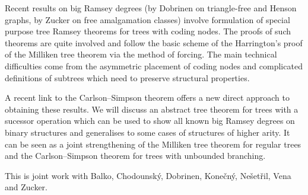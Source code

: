 \documentclass[bsl,meeting]{asl}
\newcommand{\NP}{}
\begin{document}
\thispagestyle{empty}


\NP  
{}

	Recent results on big Ramsey degrees (by Dobrinen on triangle-free and
	Henson graphs, by Zucker on free amalgamation classes) involve
	formulation of special purpose tree Ramsey theorems for trees with
	coding nodes. The proofs of such theorems are quite involved and
	follow the basic scheme of the Harrington's proof of the Milliken tree
	theorem via the method of forcing. The main technical difficulties come from the asymmetric placement
	of coding nodes and complicated definitions of subtrees which need to
	preserve structural properties.

	A recent link to the Carlson--Simpson theorem offers a new direct
	approach to obtaining these results.  We will discuss an abstract tree theorem
	for trees with a sucessor operation which can be used to show all known
	big Ramsey degrees on binary structures and generalises to some cases
	of structures of higher arity.  It can be seen as a joint
	strengthening of the Milliken tree theorem for regular trees and
	the Carlson--Simpson theorem for trees with unbounded branching.

	This is joint work with Balko, Chodounsk\' y, Dobrinen, Kone\v cn\'y, Ne\v set\v ril, Vena and Zucker.
\end{document}
